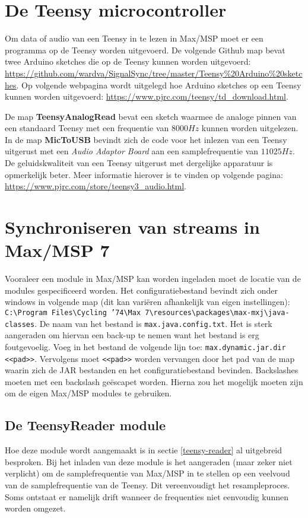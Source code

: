 \section*{De Teensy microcontroller}
\label{read-teensy}

Om data of audio van een Teensy in te lezen in Max/MSP moet er een programma op de Teensy worden uitgevoerd.
De volgende Github map bevat twee Arduino sketches die op de Teensy kunnen worden uitgevoerd: \url{https://github.com/wardva/SignalSync/tree/master/Teensy\%20Arduino\%20sketches}. Op volgende webpagina wordt uitgelegd hoe Arduino sketches op een Teensy kunnen worden uitgevoerd: \url{https://www.pjrc.com/teensy/td_download.html}. 

De map \textbf{TeensyAnalogRead} bevat een sketch waarmee de analoge pinnen van een standaard Teensy met een frequentie van $8000Hz$ kunnen worden uitgelezen. In de map \textbf{MicToUSB} bevindt zich de code voor het inlezen van een Teensy uitgerust met een \textit{Audio Adaptor Board} aan een samplefrequentie van $11025Hz$. De geluidskwaliteit van een Teensy uitgerust met dergelijke apparatuur is opmerkelijk beter. Meer informatie hierover is te vinden op volgende pagina: \url{https://www.pjrc.com/store/teensy3_audio.html}.

\section*{Synchroniseren van streams in Max/MSP 7}

Vooraleer een module in Max/MSP kan worden ingeladen moet de locatie van de modules gespecificeerd worden. Het configuratiebestand bevindt zich onder windows in volgende map (dit kan variëren afhankelijk van eigen instellingen): \texttt{C:\textbackslash Program Files\textbackslash Cycling '74\textbackslash Max 7\textbackslash resources\textbackslash packages\textbackslash max-mxj\textbackslash java-classes}. De naam van het bestand is \texttt{max.java.config.txt}. Het is sterk aangeraden om hiervan een back-up te nemen want het bestand is erg foutgevoelig. Voeg in het bestand de volgende lijn toe: \texttt{max.dynamic.jar.dir <<pad>>}. Vervolgens moet \texttt{<<pad>>} worden vervangen door het pad van de map waarin zich de JAR bestanden en het configuratiebestand bevinden. Backslashes moeten met een backslash geëscapet worden. Hierna zou het mogelijk moeten zijn om de eigen Max/MSP modules te gebruiken.

\subsection*{De TeensyReader module}
Hoe deze module wordt aangemaakt is in sectie \ref{teensy-reader} al uitgebreid besproken. Bij het inladen van deze module is het aangeraden (maar zeker niet verplicht) om de samplefrequentie van Max/MSP in te stellen op een veelvoud van de samplefrequentie van de Teensy. Dit vereenvoudigt het resampleproces. Soms ontstaat er namelijk drift wanneer de frequenties niet eenvoudig kunnen worden omgezet.


